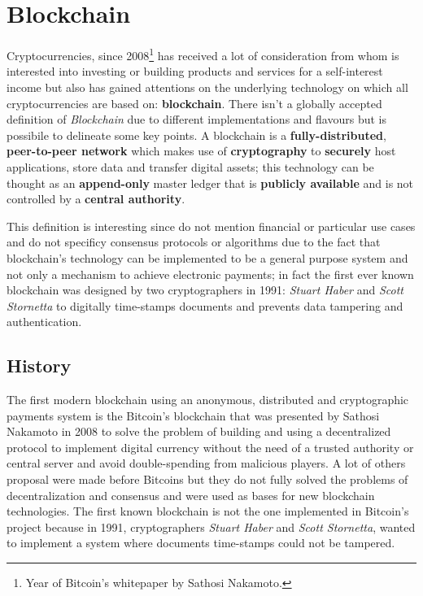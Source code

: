 \chapter{Blockchain}

Cryptocurrencies, since 2008\footnote{Year of Bitcoin's whitepaper by Sathosi Nakamoto.} has received a lot of consideration from whom is interested into investing or building products and services for a self-interest income but also has gained attentions on the underlying technology on which all cryptocurrencies are based on: \textbf{blockchain}.\newline
\newline
There isn't a globally accepted definition of \textit{Blockchain} due to different implementations and flavours but is possibile to delineate some key points.\newline
A blockchain is a \textbf{fully-distributed}, \textbf{peer-to-peer network} which makes use of \textbf{cryptography} to \textbf{securely} host applications, store data and transfer digital assets; this technology can be thought as an \textbf{append-only} master ledger that is \textbf{publicly available} and is not controlled by a \textbf{central authority}.

This definition is interesting since do not mention financial or particular use cases and do not specificy consensus protocols or algorithms due to the fact that blockchain's technology can be implemented to be a general purpose system and not only a mechanism to achieve electronic payments; in fact the first ever known blockchain was designed by two cryptographers in 1991: \textit{Stuart Haber} and \textit{Scott Stornetta} to digitally time-stamps documents and prevents data tampering and authentication.

\section{History}

The first modern blockchain using an anonymous, distributed and cryptographic payments system is the Bitcoin's blockchain that was presented by Sathosi Nakamoto in 2008 to solve the problem of building and using a decentralized protocol to implement digital currency without the need of a trusted authority or central server and avoid double-spending from malicious players.\newline
A lot of others proposal were made before Bitcoins but they do not fully solved the problems of decentralization and consensus and were used as bases for new blockchain technologies.\newline\newline
The first known blockchain is not the one implemented in Bitcoin's project because in 1991, cryptographers \textit{Stuart Haber} and \textit{Scott Stornetta}, wanted to implement a system where documents time-stamps could not be tampered\cite{haberstorneta}.


